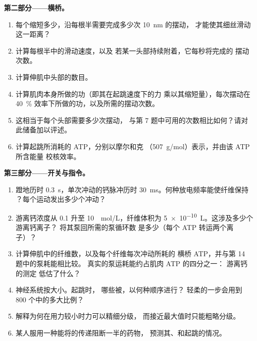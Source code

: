 \begin{problem}
\medskip
\noindent\textbf{第二部分——横桥。}
\begin{enumerate}[resume]
  \item 每个缩短多少，沿每根半需要完成多少次
        \qty{10}{nm} 的摆动，
        才能使其细丝滑动这一距离？
  \item 计算每根半中的滑动速度，以及
        若某一头部持续附着，它每秒将完成的
        摆动次数。
  \item 计算伸肌中头部的数目。
  \item 计算肌肉本身所做的功（即其在起跳速度下的力
        乘以其缩短量），每次摆动在
        \qty{40}{\%} 效率下所做的功，以及所需的摆动次数。
  \item 这相当于每个头部需要多少次摆动，
        与第 7 题中可用的次数相比如何？请对此储备加以评述。
  \item 计算起跳所消耗的 ATP，分别以摩尔和克
        （\qty{507}{g/mol}）表示，并由该 ATP 所含能量
        校核效率。
\end{enumerate}

\medskip
\noindent\textbf{第三部分——开关与指令。}
\begin{enumerate}[resume]
  \item 蹬地历时 \qty{0.3}{s}，单次冲动的钙脉冲历时
        \qty{30}{ms}。何种放电频率能使纤维保持
        ？每个运动发出多少个冲动？
  \item 游离钙浓度从 \qty{0.1}{} 升至 \qty{10}{\micro
        mol/L}，纤维体积为 \qty{5e-10}{L}。这涉及多少个游离钙离子？
        将其泵回所需的泵循环数
        是多少（每个 ATP 转运两个离子）？
  \item 计算伸肌中的纤维数，以及每个纤维每次冲动所耗的
        横桥 ATP，并与第 14 题中的泵耗能相比较。
        真实的泵运耗能约占肌肉 ATP 的四分之一：
        游离钙的测定
        低估了什么？
  \item 神经系统按大小。起跳时，
        哪些被，以何种顺序进行？
        轻柔的一步会用到 \num{800} 个中的多大比例？
  \item 解释为何在用力较小时力可以精细分级，
        而接近最大值时只能粗略分级。
  \item 某人服用一种能将的传递阻断一半的药物，
        预测其、和起跳的情况。
\end{enumerate}


\end{problem}
